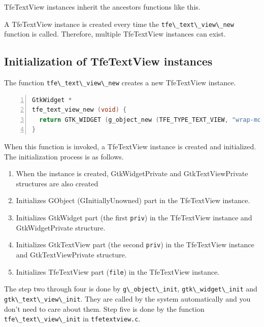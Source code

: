 TfeTextView instances inherit the ancestors functions like this.

A TfeTextView instance is created every time the
\passthrough{\lstinline!tfe\_text\_view\_new!} function is called.
Therefore, multiple TfeTextView instances can exist.

\subsection{Initialization of TfeTextView
instances}\label{initialization-of-tfetextview-instances}

The function \passthrough{\lstinline!tfe\_text\_view\_new!} creates a
new TfeTextView instance.

\begin{lstlisting}[language=C, numbers=left]
GtkWidget *
tfe_text_view_new (void) {
  return GTK_WIDGET (g_object_new (TFE_TYPE_TEXT_VIEW, "wrap-mode", GTK_WRAP_WORD_CHAR, NULL));
}
\end{lstlisting}

When this function is invoked, a TfeTextView instance is created and
initialized. The initialization process is as follows.

\begin{enumerate}
\def\labelenumi{\arabic{enumi}.}
\tightlist
\item
  When the instance is created, GtkWidgetPrivate and GtkTextViewPrivate
  structures are also created
\item
  Initializes GObject (GInitiallyUnowned) part in the TfeTextView
  instance.
\item
  Initializes GtkWidget part (the first \passthrough{\lstinline!priv!})
  in the TfeTextView instance and GtkWidgetPrivate structure.
\item
  Initializes GtkTextView part (the second
  \passthrough{\lstinline!priv!}) in the TfeTextView instance and
  GtkTextViewPrivate structure.
\item
  Initializes TfeTextView part (\passthrough{\lstinline!file!}) in the
  TfeTextView instance.
\end{enumerate}

The step two through four is done by
\passthrough{\lstinline!g\_object\_init!},
\passthrough{\lstinline!gtk\_widget\_init!} and
\passthrough{\lstinline!gtk\_text\_view\_init!}. They are called by the
system automatically and you don't need to care about them. Step five is
done by the function \passthrough{\lstinline!tfe\_text\_view\_init!} in
\passthrough{\lstinline!tfetextview.c!}.

